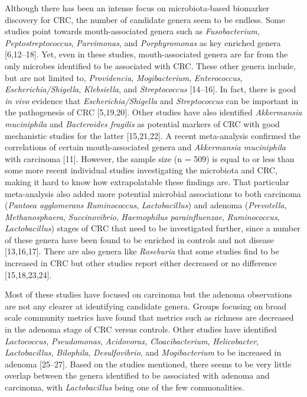 \documentclass[12pt,]{article}
\begin{document}
Although there has been an intense focus on microbiota-based biomarker
discovery for CRC, the number of candidate genera seem to be endless.
Some studies point towards mouth-associated genera such as
\emph{Fusobacterium}, \emph{Peptostreptococcus}, \emph{Parvimonas}, and
\emph{Porphyromonas} as key enriched genera {[}6,12--18{]}. Yet, even in
these studies, mouth-associated genera are far from the only microbes
identified to be associated with CRC. These other genera include, but
are not limited to, \emph{Providencia}, \emph{Mogibacterium},
\emph{Enterococcus}, \emph{Escherichia/Shigella}, \emph{Klebsiella}, and
\emph{Streptococcus} {[}14--16{]}. In fact, there is good \emph{in vivo}
evidence that \emph{Escherichia/Shigella} and \emph{Streptococcus} can
be important in the pathogenesis of CRC {[}5,19,20{]}. Other studies
have also identified \emph{Akkermansia muciniphila} and
\emph{Bacteroides fragilis} as potential markers of CRC with good
mechanistic studies for the latter {[}15,21,22{]}. A recent
meta-analysis confirmed the correlations of certain mouth-associated
genera and \emph{Akkermansia muciniphila} with carcinoma {[}11{]}.
However, the sample size (n = 509) is equal to or less than some more
recent individual studies investigating the microbiota and CRC, making
it hard to know how extrapolatable these findings are. That particular
meta-analysis also added more potential microbial associations to both
carcinoma (\emph{Pantoea agglomerans} \emph{Ruminococcus},
\emph{Lactobacillus}) and adenoma (\emph{Prevotella},
\emph{Methanosphaera}, \emph{Succinovibrio}, \emph{Haemophilus
parainfluenzae}, \emph{Ruminococcus}, \emph{Lactobacillus}) stages of
CRC that need to be investigated further, since a number of these genera
have been found to be enriched in controls and not disease
{[}13,16,17{]}. There are also genera like \emph{Roseburia} that some
studies find to be increased in CRC but other studies report either
decreased or no difference {[}15,18,23,24{]}.

Most of these studies have focused on carcinoma but the adenoma
observations are not any clearer at identifying candidate genera. Groups
focusing on broad scale community metrics have found that metrics such
as richness are decreased in the adenoma stage of CRC versus controls.
Other studies have identified \emph{Lactococcus}, \emph{Pseudomonas},
\emph{Acidovorax}, \emph{Cloacibacterium}, \emph{Helicobacter},
\emph{Lactobacillus}, \emph{Bilophila}, \emph{Desulfovibrio}, and
\emph{Mogibacterium} to be increased in adenoma {[}25--27{]}. Based on
the studies mentioned, there seems to be very little overlap between the
genera identified to be associated with adenoma and carcinoma, with
\emph{Lactobacillus} being one of the few commonalities.
\end{document}
